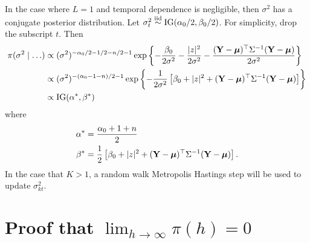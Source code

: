 In the case where $L = 1$ and temporal dependence is negligible, then $\sigma^2$ has a conjugate posterior distribution.
Let $\sigma_t^2 \stackrel{\mathrm{iid}}{\sim} \mbox{IG}(\alpha_0 / 2, \beta_0 / 2)$. For simplicity, drop the subscript $t$. Then
\begin{align*}
    \pi(\sigma^2 \mid \ldots) & \propto (\sigma^2)^{ -\alpha_0 / 2 - 1 / 2 - n / 2 - 1} \exp \left\{ -\frac{\beta_0}{2\sigma^2} - \frac{ |z|^2 }{2 \sigma^2} - \frac{ (\mathbf{Y} - \mbox{\boldmath $\mu$})^\top \Sigma^{-1} (\mathbf{Y} - \mbox{\boldmath $\mu$}) }{2 \sigma^2} \right\} \\
    & \propto (\sigma^2)^{ -(\alpha_0 - 1 - n) / 2 - 1} \exp \left\{ - \frac{ 1 }{ 2 \sigma^2 } \left[\beta_0 + |z|^2 + (\mathbf{Y} - \mbox{\boldmath $\mu$})^\top \Sigma^{-1} (\mathbf{Y} - \mbox{\boldmath $\mu$}) \right] \right\} \\
    & \propto \mbox{IG} (\alpha^*, \beta^*)
\end{align*}
where
\begin{align*}
    \alpha^* &= \frac{\alpha_0 + 1 + n}{2} \\
    \beta^* &= \frac{1}{2} \left[ \beta_0 + |z|^2 + (\mathbf{Y} - \mbox{\boldmath $\mu$})^\top \Sigma^{-1} (\mathbf{Y} - \mbox{\boldmath $\mu$}) \right].
\end{align*}
In the case that $K > 1$, a random walk Metropolis Hastings step will be used to update $\sigma^2_{kt}$.

\section{Proof that $\displaystyle \lim_{h \rightarrow \infty} \pi(h) = 0$} \label{sta:proofsamepartition}

